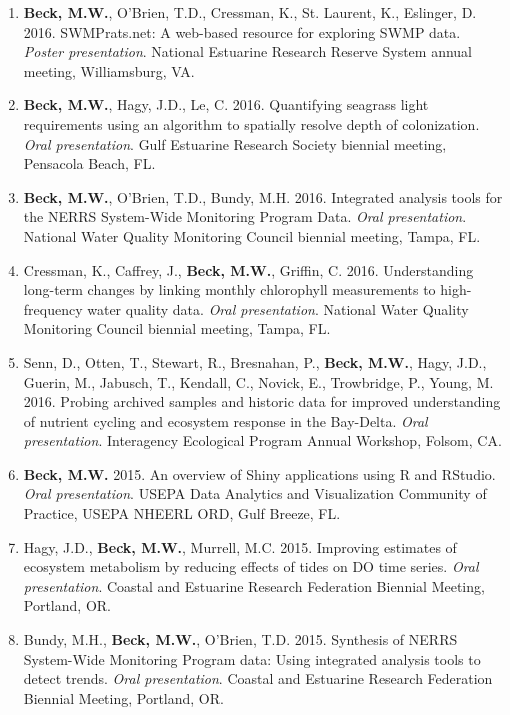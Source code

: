 \documentclass[letterpaper,12pt]{article}
\begin{document}
\begin{enumerate}

\item {\bf Beck, M.W.}, O'Brien, T.D., Cressman, K., St. Laurent, K., Eslinger, D. 2016. SWMPrats.net: A web-based resource for exploring SWMP data. \textit{Poster presentation}. National Estuarine Research Reserve System annual meeting, Williamsburg, VA. 

\item {\bf Beck, M.W.}, Hagy, J.D., Le, C. 2016. Quantifying seagrass light requirements using an algorithm to spatially resolve depth of colonization. \textit{Oral presentation}. Gulf Estuarine Research Society biennial meeting, Pensacola Beach, FL.

\item {\bf Beck, M.W.}, O'Brien, T.D., Bundy, M.H. 2016. Integrated analysis tools for the NERRS System-Wide Monitoring Program Data. \textit{Oral presentation}. National Water Quality Monitoring Council biennial meeting, Tampa, FL.

\item Cressman, K., Caffrey, J., {\bf Beck, M.W.}, Griffin, C. 2016. Understanding long-term changes by linking monthly chlorophyll measurements to high-frequency water quality data. \textit{Oral presentation}. National Water Quality Monitoring Council biennial meeting, Tampa, FL.

\item Senn, D., Otten, T., Stewart, R., Bresnahan, P., {\bf Beck, M.W.}, Hagy, J.D., Guerin, M., Jabusch, T., Kendall, C., Novick, E., Trowbridge, P., Young, M. 2016. Probing archived samples and historic data for improved understanding of nutrient cycling and ecosystem response in the Bay-Delta. \textit{Oral presentation}. Interagency Ecological Program Annual Workshop, Folsom, CA.

\item {\bf Beck, M.W.} 2015. An overview of Shiny applications using R and RStudio. \textit{Oral presentation}. USEPA Data Analytics and Visualization Community of Practice, USEPA NHEERL ORD, Gulf Breeze, FL.

\item Hagy, J.D., {\bf Beck, M.W.}, Murrell, M.C. 2015. Improving estimates of ecosystem metabolism by reducing effects of tides on DO time series. \textit{Oral presentation}. Coastal and Estuarine Research Federation Biennial Meeting, Portland, OR. 

\item Bundy, M.H., {\bf Beck, M.W.}, O'Brien, T.D. 2015. Synthesis of NERRS System-Wide Monitoring Program data: Using integrated analysis tools to detect trends. \textit{Oral presentation}. Coastal and Estuarine Research Federation Biennial Meeting, Portland, OR.


\end{enumerate}
\end{document}
